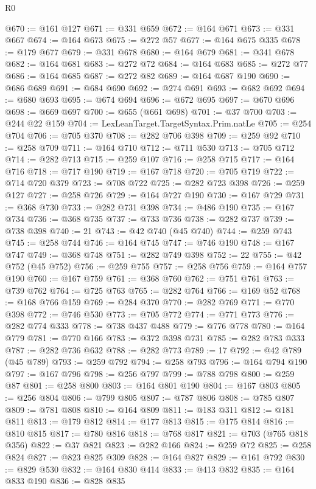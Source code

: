 \begin{lexlean}{R0}
\begin{coremodule}
@670 := @161 @127
@671 := @331 @659
@672 := @164 @671
@673 := @331 @667
@674 := @164 @673
@675 := @272 @57
@677 := @164 @675 @335
@678 := @179 @677
@679 := @331 @678
@680 := @164 @679
@681 := @341 @678
@682 := @164 @681
@683 := @272 @72
@684 := @164 @683
@685 := @272 @77
@686 := @164 @685
@687 := @272 @82
@689 := @164 @687 @190
@690 := @686 @689
@691 := @684 @690
@692 := @274 @691
@693 := @682 @692
@694 := @680 @693
@695 := @674 @694
@696 := @672 @695
@697 := @670 @696
@698 := @669 @697
@700 := @655 (@661 @698)
@701 := @37 @700
@703 := @244 @22 @159
@704 := LexLeanTarget.TargetSyntax.Prim.natLe
@705 := @254 @704
@706 := @705 @370
@708 := @282 @706 @398
@709 := @259 @92
@710 := @258 @709
@711 := @164 @710
@712 := @711 @530
@713 := @705 @712
@714 := @282 @713
@715 := @259 @107
@716 := @258 @715
@717 := @164 @716
@718 := @717 @190
@719 := @167 @718
@720 := @705 @719
@722 := @714 @720 @379
@723 := @708 @722
@725 := @282 @723 @398
@726 := @259 @127
@727 := @258 @726
@729 := @164 @727 @190
@730 := @167 @729
@731 := @368 @730
@733 := @282 @731 @398
@734 := @486 @190
@735 := @167 @734
@736 := @368 @735
@737 := @733 @736
@738 := @282 @737
@739 := @738 @398
@740 := 21
@743 := @42 @740 (@45 @740)
@744 := @259 @743
@745 := @258 @744
@746 := @164 @745
@747 := @746 @190
@748 := @167 @747
@749 := @368 @748
@751 := @282 @749 @398
@752 := 22
@755 := @42 @752 (@45 @752)
@756 := @259 @755
@757 := @258 @756
@759 := @164 @757 @190
@760 := @167 @759
@761 := @368 @760
@762 := @751 @761
@763 := @739 @762
@764 := @725 @763
@765 := @282 @764
@766 := @169 @52
@768 := @168 @766 @159
@769 := @284 @370
@770 := @282 @769
@771 := @770 @398
@772 := @746 @530
@773 := @705 @772
@774 := @771 @773
@776 := @282 @774 @333
@778 := @738 @437 @488
@779 := @776 @778
@780 := @164 @779
@781 := @770 @166
@783 := @372 @398 @731
@785 := @282 @783 @333
@787 := @282 @736 @632
@788 := @282 @773
@789 := 17
@792 := @42 @789 (@45 @789)
@793 := @259 @792
@794 := @258 @793
@796 := @164 @794 @190
@797 := @167 @796
@798 := @256 @797
@799 := @788 @798
@800 := @259 @87
@801 := @258 @800
@803 := @164 @801 @190
@804 := @167 @803
@805 := @256 @804
@806 := @799 @805
@807 := @787 @806
@808 := @785 @807
@809 := @781 @808
@810 := @164 @809
@811 := @183 @311
@812 := @181 @811
@813 := @179 @812
@814 := @177 @813
@815 := @175 @814
@816 := @810 @815
@817 := @780 @816
@818 := @768 @817
@821 := @703 (@765 @818 @356)
@822 := @37 @821
@823 := @282 @166
@824 := @259 @72
@825 := @258 @824
@827 := @823 @825 @309
@828 := @164 @827
@829 := @161 @792
@830 := @829 @530
@832 := @164 @830 @414
@833 := @413 @832
@835 := @164 @833 @190
@836 := @828 @835

\end{coremodule}
\end{lexlean}
